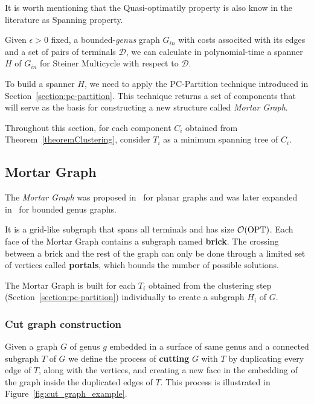 It is worth mentioning that the Quasi-optimatily property is also know in the literature as Spanning property.

\begin{ftheo}\label{theorem:spanner}
Given \(\epsilon > 0\) fixed, a bounded-\textit{genus} graph \(G_{in}\) with costs associted with its edges and a set of pairs of terminals \(\mathcal{D}\), we can calculate in polynomial-time a spanner \(H\) of \(G_{in}\) for Steiner Multicycle with respect to \(\mathcal{D}\).
\end{ftheo}

To build a spanner \(H\), we need to apply the PC-Partition technique introduced in Section~\ref{section:pc-partition}. This technique returns a set of components that will serve as the basis for constructing a new structure called \textit{Mortar Graph}.

Throughout this section, for each component \(C_i\) obtained from Theorem~\ref{theoremClustering}, consider \(T_i\) as a minimum spanning tree of \(C_i\).

\subsection{Mortar Graph}

The \textit{Mortar Graph} was proposed in~\cite{Borradaile2009b} for planar graphs and was later expanded in~\cite{Borradaile2012} for bounded genus graphs.

It is a grid-like subgraph that spans all terminals and has size \(\mathcal{O}(\operatorname{\textrm{OPT}})\). Each face of the Mortar Graph contains a subgraph named \textbf{brick}. The crossing between a brick and the rest of the graph can only be done through a limited set of vertices called \textbf{portals}, which bounds the number of possible solutions.

The Mortar Graph is built for each \(T_i\) obtained from the clustering step (Section~\ref{section:pc-partition}) individually to create a subgraph \(H_i\) of \(G\).

\subsubsection{Cut graph construction}

Given a graph \(G\) of genus \(g\) embedded in a surface of same genus and a connected subgraph \(T\) of \(G\) we define the process of \textbf{cutting} \(G\) with \(T\) by duplicating every edge of \(T\), along with the vertices, and creating a new face in the embedding of the graph inside the duplicated edges of \(T\). This process is illustrated in Figure~\ref{fig:cut_graph_example}.

